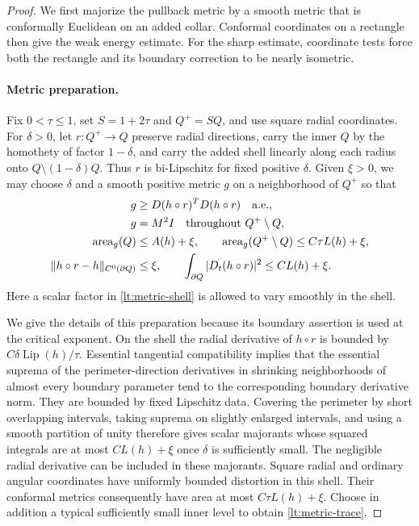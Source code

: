 \documentclass[11pt]{article}
\numberwithin{equation}{section}
\theoremstyle{definition}
\theoremstyle{remark}
\DeclareMathOperator{\Lip}{Lip}
\begin{document}
\begin{proof}
We first majorize the pullback metric by a smooth metric that is
conformally Euclidean on an added collar. Conformal coordinates on a
rectangle then give the weak energy estimate. For the sharp estimate,
coordinate tests force both the rectangle and its boundary correction
to be nearly isometric.

\paragraph{Metric preparation.}
Fix $0<\tau\leq1$, set $S=1+2\tau$ and
$Q^+=SQ$, and use square radial coordinates.  For $\delta>0$, let
$r:Q^+\to Q$ preserve radial directions, carry the inner $Q$ by the
homothety of factor $1-\delta$, and carry the added shell linearly along
each radius onto $Q\setminus(1-\delta)Q$.  Thus $r$ is bi-Lipschitz
for fixed positive $\delta$.  Given $\xi>0$, we may choose $\delta$
and a smooth positive metric $g$ on a neighborhood of $Q^+$ so that
\begin{align}
 g&\geq D(h\circ r)^TD(h\circ r)\quad\hbox{a.e.},
       \label{lt:metric-dominates}\\
 g&=M^2I\quad\hbox{throughout }Q^+\setminus Q,
       \label{lt:metric-shell}\\
 \operatorname{area}_g(Q)&\leq A(h)+\xi,
 \qquad
 \operatorname{area}_g(Q^+\setminus Q)
       \leq C\tau L(h)+\xi,                 \label{lt:metric-area}\\
 \|h\circ r-h\|_{C^0(\partial Q)}&\leq\xi,
 \qquad
 \int_{\partial Q}|D_t(h\circ r)|^2
       \leq CL(h)+\xi.                    \label{lt:metric-trace}
\end{align}
Here a scalar factor in \eqref{lt:metric-shell} is allowed to vary
smoothly in the shell.

We give the details of this preparation because its boundary assertion
is used at the critical exponent.  On the shell the radial derivative
of $h\circ r$ is bounded by $C\delta\Lip(h)/\tau$.  Essential
tangential compatibility implies that the essential suprema of the
perimeter-direction derivatives in shrinking neighborhoods of almost
every boundary parameter tend to the corresponding boundary derivative
norm.  They are bounded by fixed Lipschitz data.  Covering the perimeter
by short overlapping intervals, taking suprema on slightly enlarged
intervals, and using a smooth partition of unity therefore gives scalar
majorants whose squared integrals are at most $CL(h)+\xi$ once
$\delta$ is sufficiently small.  The negligible radial derivative can
be included in these majorants.  Square radial and ordinary angular
coordinates have uniformly bounded distortion in this shell.  Their
conformal metrics consequently have area at most $C\tau L(h)+\xi$.
Choose in addition a typical sufficiently small inner level to obtain
\eqref{lt:metric-trace}.


\end{proof}
\end{document}
